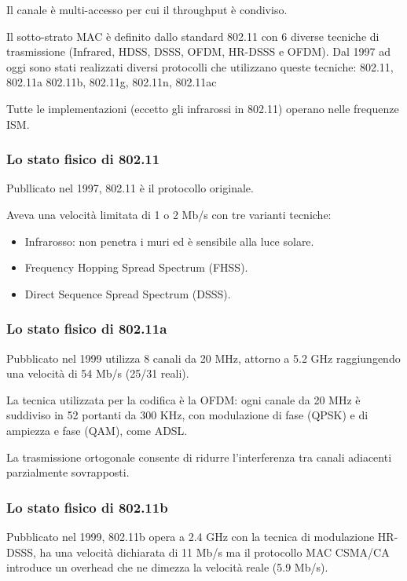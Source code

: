             Il canale è multi-accesso per cui il throughput è condiviso.
    
            Il sotto-strato MAC è definito dallo standard 802.11 con 6 diverse tecniche di trasmissione (Infrared, HDSS, DSSS, OFDM, HR-DSSS e OFDM). Dal 1997 ad oggi sono stati realizzati diversi protocolli che utilizzano queste tecniche: 802.11, 802.11a 802.11b, 802.11g, 802.11n, 802.11ac
        
            Tutte le implementazioni (eccetto gli infrarossi in 802.11) operano nelle frequenze ISM.

        \subsubsection{Lo stato fisico di 802.11}
            Publlicato nel 1997, 802.11 è il protocollo originale.
        
            Aveva una velocità limitata di 1 o 2 Mb/s con tre varianti tecniche:
            \begin{itemize}
                \item Infrarosso: non penetra i muri ed è sensibile alla luce solare.
                \item Frequency Hopping Spread Spectrum (FHSS).
                \item Direct Sequence Spread Spectrum (DSSS).
            \end{itemize}
            
        \subsubsection{Lo stato fisico di 802.11a}
            Pubblicato nel 1999 utilizza 8 canali da 20 MHz, attorno a 5.2 GHz raggiungendo una velocità di 54 Mb/s (25/31 reali).
        
            La tecnica utilizzata per la codifica è la OFDM: ogni canale da 20 MHz è suddiviso in 52 portanti da 300 KHz, con modulazione di fase (QPSK) e di ampiezza e fase (QAM), come ADSL.

            La trasmissione ortogonale consente di ridurre l'interferenza tra canali adiacenti parzialmente sovrapposti.
        
        \subsubsection{Lo stato fisico di 802.11b}
            Pubblicato nel 1999, 802.11b opera a 2.4 GHz con la tecnica di modulazione HR-DSSS, ha una velocità dichiarata di 11 Mb/s ma il protocollo MAC CSMA/CA introduce un overhead che ne dimezza la velocità reale (5.9 Mb/s).

